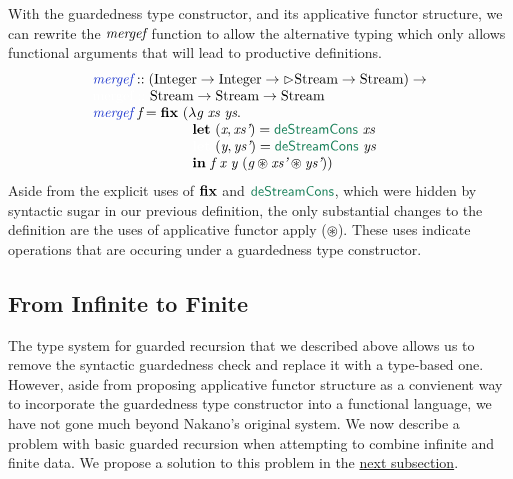 With the guardedness type constructor, and its applicative functor
structure, we can rewrite the $\textit{mergef}$ function to allow the
alternative typing which only allows functional arguments that will
lead to productive definitions.
\begin{displaymath}
  \begin{array}{l}
    \defn{mergef} :: (\tyname{Integer} \to \tyname{Integer} \to \rhd\tyname{Stream} \to \tyname{Stream}) \to \\
    \textcolor{white}{\textrm{mergef} :: }\ \tyname{Stream} \to \tyname{Stream} \to \tyname{Stream} \\
    \defn{mergef}\ \ident{f} = \kw{fix}\ (\lambda \ident{g}\ \ident{xs}\ \ident{ys}. \\
    \hspace{2.5cm} \kw{let}\ (\ident{x}, \ident{xs'}) = \elim{deStreamCons}\ \ident{xs} \\
    \hspace{2.5cm} \textcolor{white}{\kw{let}\ }(\ident{y}, \ident{ys'}) = \elim{deStreamCons}\ \ident{ys} \\
    \hspace{2.5cm} \kw{in}\ \ident{f}\ \ident{x}\ \ident{y}\ (\ident{g} \circledast \ident{xs'} \circledast \ident{ys'}))
  \end{array}
\end{displaymath}
Aside from the explicit uses of $\textbf{fix}$ and $\elim{deStreamCons}$,
which were hidden by syntactic sugar in our previous definition, the
only substantial changes to the definition are the uses of applicative
functor apply ($\circledast$). These uses indicate operations that are
occuring under a guardedness type constructor.

\subsection{From Infinite to Finite}
\label{sec:infinite-to-finite}

The type system for guarded recursion that we described above allows
us to remove the syntactic guardedness check and replace it with a
type-based one. However, aside from proposing applicative functor
structure as a convienent way to incorporate the guardedness type
constructor into a functional language, we have not gone much beyond
Nakano's original system. We now describe a problem with basic guarded
recursion when attempting to combine infinite and finite data. We
propose a solution to this problem in the
\hyperref[sec:clock-vars]{next subsection}.

